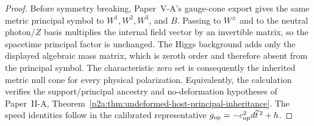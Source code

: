 \documentclass[12pt,a4paper]{article}
\begin{document}
\begin{proof}
Before symmetry breaking, Paper~V-A's gauge-cone export gives the same metric
principal symbol to \(W^1,W^2,W^3\), and \(B\).  Passing to
\(W^\pm\) and to the neutral photon/\(Z\) basis multiplies the internal field
vector by an invertible matrix, so the spacetime principal factor is unchanged.
The Higgs background adds only the displayed algebraic mass matrix, which is
zeroth order and therefore absent from the principal symbol.  The characteristic
zero set is consequently the inherited metric null cone for every physical
polarization.  Equivalently, the calculation verifies the support/principal
ancestry and no-deformation hypotheses of Paper~II-A,
Theorem~\ref{p2a:thm:undeformed-host-principal-inheritance}.  The speed
identities follow in the calibrated representative
\(g_{\rm op}=-c_{\rm op}^2d\widetilde t^{\,2}+h\).
\end{proof}
\end{document}
